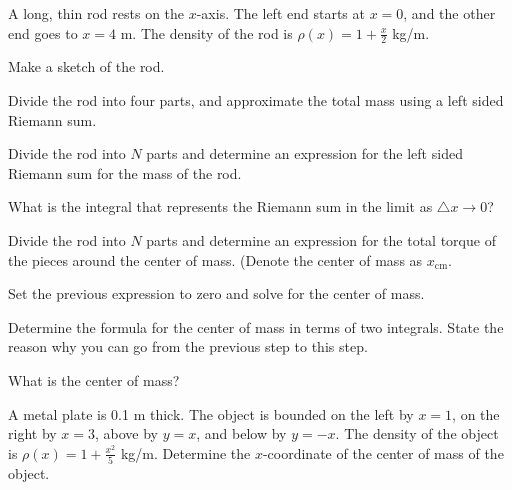 \begin{problem}
\item A long, thin rod rests on the $x$-axis. The left end starts at
  $x=0$, and the other end goes to $x=4$ m. The density of the rod is
  $\rho(x)=1+\frac{x}{2}$ kg/m.
  \begin{subproblem}
  \item Make a sketch of the rod.
    \vspace{2em}
  \item Divide the rod into four parts, and approximate the total mass
    using a left sided Riemann sum.
    \vfill
  \item Divide the rod into $N$ parts and determine an expression for
    the left sided Riemann sum for the mass of the rod.
    \vfill
  \item What is the integral that represents the Riemann sum in the
    limit as $\triangle x \rightarrow 0$?

    \clearpage

  \item Divide the rod into $N$ parts and determine an expression for
    the total torque of the pieces around the center of mass. (Denote
    the center of mass as $x_{\mathrm{cm}}$.
    \vfill

  \item Set the previous expression to zero and solve  for the center of mass.
    \vfill

  \item Determine the formula for the center of mass in terms of two
    integrals. State the reason why you can go from the previous step
    to this step.

    \vfill

  \item What is the center of mass?

    \vfill

  \end{subproblem}

  \clearpage

\item A metal plate is 0.1 m thick. The object is bounded on the left by
  $x=1$, on the right by $x=3$, above by $y=x$, and below by
  $y=-x$. The density of the object is $\rho(x)=1+\frac{x^2}{5}$
  kg/m. Determine the $x$-coordinate of the center of mass of the
  object.

  \vfill


\end{problem}

